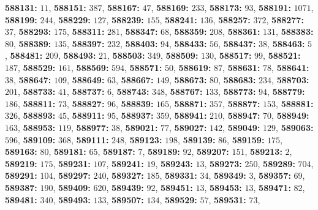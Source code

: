 \textsf{\bfseries 588131:} $11$, \textsf{\bfseries 588151:} $387$, \textsf{\bfseries 588167:} $47$, \textsf{\bfseries 588169:} $233$, \textsf{\bfseries 588173:} $93$, \textsf{\bfseries 588191:} $1071$, \textsf{\bfseries 588199:} $244$, \textsf{\bfseries 588229:} $127$, \textsf{\bfseries 588239:} $155$, \textsf{\bfseries 588241:} $136$, \textsf{\bfseries 588257:} $372$, \textsf{\bfseries 588277:} $37$, \textsf{\bfseries 588293:} $175$, \textsf{\bfseries 588311:} $281$, \textsf{\bfseries 588347:} $68$, \textsf{\bfseries 588359:} $208$, \textsf{\bfseries 588361:} $131$, \textsf{\bfseries 588383:} $80$, \textsf{\bfseries 588389:} $135$, \textsf{\bfseries 588397:} $232$, \textsf{\bfseries 588403:} $94$, \textsf{\bfseries 588433:} $56$, \textsf{\bfseries 588437:} $38$, \textsf{\bfseries 588463:} $5$, \textsf{\bfseries 588481:} $209$, \textsf{\bfseries 588493:} $21$, \textsf{\bfseries 588503:} $349$, \textsf{\bfseries 588509:} $130$, \textsf{\bfseries 588517:} $99$, \textsf{\bfseries 588521:} $187$, \textsf{\bfseries 588529:} $161$, \textsf{\bfseries 588569:} $594$, \textsf{\bfseries 588571:} $50$, \textsf{\bfseries 588619:} $87$, \textsf{\bfseries 588631:} $78$, \textsf{\bfseries 588641:} $38$, \textsf{\bfseries 588647:} $109$, \textsf{\bfseries 588649:} $63$, \textsf{\bfseries 588667:} $149$, \textsf{\bfseries 588673:} $80$, \textsf{\bfseries 588683:} $234$, \textsf{\bfseries 588703:} $201$, \textsf{\bfseries 588733:} $41$, \textsf{\bfseries 588737:} $6$, \textsf{\bfseries 588743:} $348$, \textsf{\bfseries 588767:} $133$, \textsf{\bfseries 588773:} $94$, \textsf{\bfseries 588779:} $186$, \textsf{\bfseries 588811:} $73$, \textsf{\bfseries 588827:} $96$, \textsf{\bfseries 588839:} $165$, \textsf{\bfseries 588871:} $357$, \textsf{\bfseries 588877:} $153$, \textsf{\bfseries 588881:} $326$, \textsf{\bfseries 588893:} $45$, \textsf{\bfseries 588911:} $95$, \textsf{\bfseries 588937:} $359$, \textsf{\bfseries 588941:} $210$, \textsf{\bfseries 588947:} $70$, \textsf{\bfseries 588949:} $163$, \textsf{\bfseries 588953:} $119$, \textsf{\bfseries 588977:} $38$, \textsf{\bfseries 589021:} $77$, \textsf{\bfseries 589027:} $142$, \textsf{\bfseries 589049:} $129$, \textsf{\bfseries 589063:} $596$, \textsf{\bfseries 589109:} $368$, \textsf{\bfseries 589111:} $248$, \textsf{\bfseries 589123:} $198$, \textsf{\bfseries 589139:} $86$, \textsf{\bfseries 589159:} $175$, \textsf{\bfseries 589163:} $80$, \textsf{\bfseries 589181:} $65$, \textsf{\bfseries 589187:} $7$, \textsf{\bfseries 589189:} $92$, \textsf{\bfseries 589207:} $151$, \textsf{\bfseries 589213:} $2$, \textsf{\bfseries 589219:} $175$, \textsf{\bfseries 589231:} $107$, \textsf{\bfseries 589241:} $19$, \textsf{\bfseries 589243:} $13$, \textsf{\bfseries 589273:} $250$, \textsf{\bfseries 589289:} $704$, \textsf{\bfseries 589291:} $104$, \textsf{\bfseries 589297:} $240$, \textsf{\bfseries 589327:} $185$, \textsf{\bfseries 589331:} $34$, \textsf{\bfseries 589349:} $3$, \textsf{\bfseries 589357:} $69$, \textsf{\bfseries 589387:} $190$, \textsf{\bfseries 589409:} $620$, \textsf{\bfseries 589439:} $92$, \textsf{\bfseries 589451:} $13$, \textsf{\bfseries 589453:} $13$, \textsf{\bfseries 589471:} $82$, \textsf{\bfseries 589481:} $340$, \textsf{\bfseries 589493:} $133$, \textsf{\bfseries 589507:} $134$, \textsf{\bfseries 589529:} $57$, \textsf{\bfseries 589531:} $73$, 

